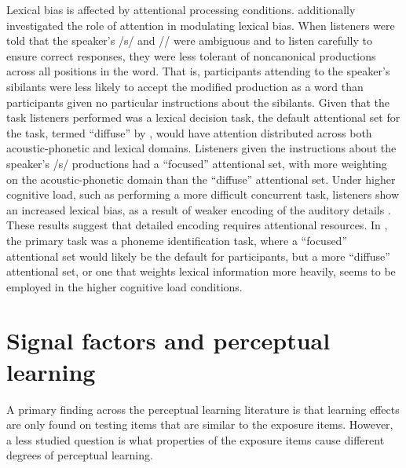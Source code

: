 Lexical bias is affected by attentional processing conditions.
\citet{Pitt2012} additionally investigated the role of attention in modulating lexical bias.  
When listeners were told that the speaker's /s/ and /\textesh/ were ambiguous and to listen carefully to ensure correct responses, they were less tolerant of noncanonical productions across all positions in the word.  
That is, participants attending to the speaker's sibilants were less likely to accept the modified production as a word than participants given no particular instructions about the sibilants.
Given that the task listeners performed was a lexical decision task, the default attentional set for the task, termed ``diffuse'' by \citet{Pitt2012}, would have attention distributed across both acoustic-phonetic and lexical domains.  Listeners given the instructions about the speaker's /s/ productions had a ``focused'' attentional set, with more weighting on the acoustic-phonetic domain than the ``diffuse'' attentional set.
Under higher cognitive load, such as performing a more difficult concurrent task, listeners show an increased lexical bias, as a result of weaker encoding of the auditory details \citep{Mattys2011}.  These results suggest that detailed encoding requires attentional resources.  In \citet{Mattys2011}, the primary task was a phoneme identification task, where a ``focused'' attentional set would likely be the default for participants, but a more ``diffuse'' attentional set, or one that weights lexical information more heavily, seems to be employed in the higher cognitive load conditions.

\section{Signal factors and perceptual learning}
\label{sec:signal}

A primary finding across the perceptual learning literature is that learning effects are only found on testing items that are similar to the exposure items.  However, a less studied question is what properties of the exposure items cause different degrees of perceptual learning.  

